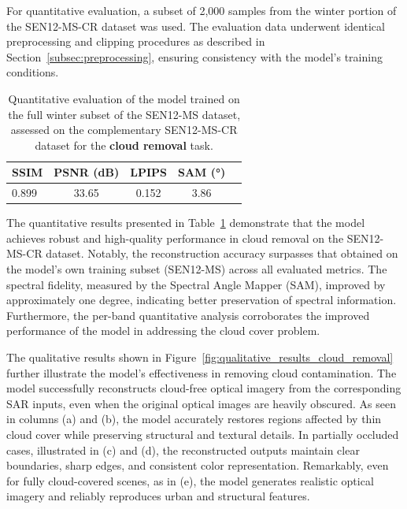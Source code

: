 For quantitative evaluation, a subset of 2,000 samples from the winter portion of the SEN12-MS-CR dataset was used. The evaluation data underwent identical preprocessing and clipping procedures as described in Section~\ref{subsec:preprocessing}, ensuring consistency with the model’s training conditions.


\begin{table}[h!]
\centering
\caption[Quantitative results on cloud removal]{Quantitative evaluation of the model trained on the full winter subset of the SEN12-MS dataset, assessed on the complementary SEN12-MS-CR dataset for the \textbf{cloud removal} task.}
\begin{tabular}{lcccc}
\toprule
\textbf{SSIM} & \textbf{PSNR (dB)} & \textbf{LPIPS} & \textbf{SAM (°)} \\
\midrule
0.899 & 33.65 & 0.152 & 3.86 \\
\bottomrule
\end{tabular}
\label{tab:quantitative_result_cr}
\end{table}
The quantitative results presented in Table~\ref{tab:quantitative_result_cr} demonstrate that the model achieves robust and high-quality performance in cloud removal on the SEN12-MS-CR dataset. Notably, the reconstruction accuracy surpasses that obtained on the model’s own training subset (SEN12-MS) across all evaluated metrics. The spectral fidelity, measured by the Spectral Angle Mapper (SAM), improved by approximately one degree, indicating better preservation of spectral information. Furthermore, the per-band quantitative analysis corroborates the improved performance of the model in addressing the cloud cover problem.

The qualitative results shown in Figure~\ref{fig:qualitative_results_cloud_removal} further illustrate the model’s effectiveness in removing cloud contamination. The model successfully reconstructs cloud-free optical imagery from the corresponding SAR inputs, even when the original optical images are heavily obscured. As seen in columns (a) and (b), the model accurately restores regions affected by thin cloud cover while preserving structural and textural details. In partially occluded cases, illustrated in (c) and (d), the reconstructed outputs maintain clear boundaries, sharp edges, and consistent color representation. Remarkably, even for fully cloud-covered scenes, as in (e), the model generates realistic optical imagery and reliably reproduces urban and structural features.

